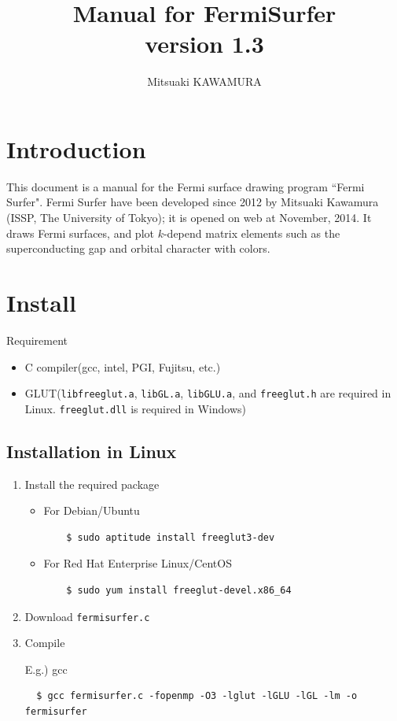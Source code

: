 \documentclass[12pt]{article}
\begin{document}
%
%
\title{Manual for FermiSurfer\\
version 1.3}
\author{Mitsuaki KAWAMURA}
\maketitle

\tableofcontents

\section{Introduction}

This document is a manual for the Fermi surface drawing program ``Fermi Surfer".
Fermi Surfer have been  developed since 2012 by Mitsuaki Kawamura
(ISSP, The University of Tokyo); 
it is opened on web at November, 2014.
It draws Fermi surfaces, and 
plot $k$-depend matrix elements such as the superconducting gap and
orbital character with colors.

\section{Install}

Requirement
\begin{itemize}
\item C compiler(gcc, intel, PGI, Fujitsu, etc.)
\item GLUT(\texttt{libfreeglut.a}, \texttt{libGL.a}, \texttt{libGLU.a},
 and \texttt{freeglut.h} are required in Linux. 
 \texttt{freeglut.dll} is required in Windows)
\end{itemize}

\subsection{Installation in Linux}

\begin{enumerate}

\item Install the required package

  \begin{itemize}
  \item For Debian/Ubuntu
    \begin{verbatim}
    $ sudo aptitude install freeglut3-dev
    \end{verbatim}
  \item For Red Hat Enterprise Linux/CentOS
    \begin{verbatim}
    $ sudo yum install freeglut-devel.x86_64
    \end{verbatim}
  \end{itemize}

\item Download \verb|fermisurfer.c|

\item Compile

E.g.) gcc 

\begin{verbatim}
  $ gcc fermisurfer.c -fopenmp -O3 -lglut -lGLU -lGL -lm -o fermisurfer
\end{verbatim}

\end{enumerate}
\end{document}
